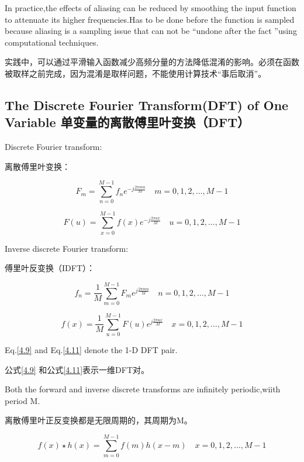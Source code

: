 \documentclass[12pt]{article}
\numberwithin{equation}{section}%
\begin{document}
In practice,the effects of aliasing can be reduced by smoothing the input function to attenuate its higher frequencies.Has to be done before the function is sampled because aliasing is a sampling issue that can not be ``undone after the fact ''using computational techniques.

实践中，可以通过平滑输入函数减少高频分量的方法降低混淆的影响。必须在函数被取样之前完成，因为混淆是取样问题，不能使用计算技术“事后取消”。

\subsection{The Discrete Fourier Transform(DFT) of One Variable 单变量的离散傅里叶变换（DFT）}

Discrete Fourier transform:

离散傅里叶变换：

\begin{equation} \label{4.8}
F_{m}=\sum_{n=0}^{M-1}f_{n}e^{-j\frac{2\pi mn}{M}} \quad m=0,1,2,\ldots,M-1
\end{equation}

\begin{equation} \label{4.9}
F(u)=\sum_{x=0}^{M-1}f(x)e^{-j\frac{2\pi ux}{M}} \quad u=0,1,2,\ldots,M-1
\end{equation}

Inverse discrete Fourier transform:

傅里叶反变换（IDFT）：

\begin{equation} \label{4.10}
f_{n}=\frac{1}{M}\sum_{m=0}^{M-1}F_{m}e^{j\frac{2\pi mn}{M}} \quad n=0,1,2,\ldots,M-1
\end{equation}

\begin{equation} \label{4.11}
f(x)=\frac{1}{M}\sum_{u=0}^{M-1}F(u)e^{j\frac{2\pi ux}{M}} \quad x=0,1,2,\ldots,M-1
\end{equation}

Eq.\ref{4.9} and Eq.\ref{4.11} denote the 1-D DFT pair.

公式\ref{4.9} 和公式\ref{4.11}表示一维DFT对。

Both the forward and inverse discrete transforms are infinitely periodic,wiith period M.

离散傅里叶正反变换都是无限周期的，其周期为M。

\begin{equation} \label{4.12}
f(x)\star h(x)=\sum_{m=0}^{M-1}f(m)h(x-m) \quad x=0,1,2,\ldots,M-1
\end{equation}
\end{document}
